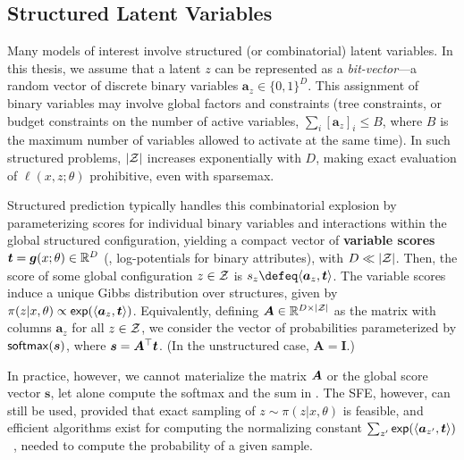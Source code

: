 \subsection{Structured Latent Variables}\label{sec:struct_lvm_bg}

\noindent Many models of interest involve structured (or combinatorial) latent
variables. In this thesis, we assume that a latent $z$ can be represented as a
        {\it bit-vector}---\ie a random vector of discrete binary variables
$\bm{a}_{z} \in \{0, 1\}^D$. This assignment of binary variables may
involve global factors and constraints (\eg tree constraints, or
budget constraints on the number of active variables, \ie $\sum_i
        [\bm{a}_{z}]_i \le B$, where $B$ is the maximum number of variables
allowed to activate at the same time). In such structured problems,
$|\ZZ|$ increases exponentially with $D$, making exact evaluation of
$\ell(x, z; \theta)$ prohibitive, even with sparsemax.

Structured prediction typically handles this combinatorial explosion
by parameterizing scores for individual binary variables and
interactions within the global structured configuration, yielding a
compact vector of \textbf{variable scores} $\bm{t} = \g(x; \theta)
        \in \mathbb{R}^D$ (\eg, log-potentials for binary attributes), with
$D \ll |\ZZ|$. Then, the score of some global configuration $z \in
        \ZZ$ is $s_z \defeq \DP{\bm{a}_z}{\bm{t}}$. The variable scores
induce a unique Gibbs distribution over structures, given by
$\pi(z|x,\theta) \propto \exp(\DP{\bm{a}_{z}}{\bm{t}})$.
Equivalently, defining $\bm{A} \in \mathbb{R}^{D \times |\ZZ|}$ as
the matrix with columns $\bm{a}_{z}$ for all $z \in \ZZ$, we consider
the vector of probabilities parameterized by $\softmax(\s)$, where
$\s=\bm{A}^\top \bm{t}$. (In the unstructured case, $\bm{A}=\bm{I}$.)

In practice, however, we cannot materialize the matrix $\AA$ or the
global score vector $\bm{s}$, let alone compute the softmax and the
sum in . The SFE, however, can still be used, provided
that exact sampling of $z\sim\pi(z | x, \theta)$ is feasible, and
efficient algorithms exist for computing the normalizing constant
$\sum_{z'}\exp(\DP{\bm{a}_{z'}}{\bm{t}})$~\citep{WJ2008}, needed to
compute the probability of a given sample.
